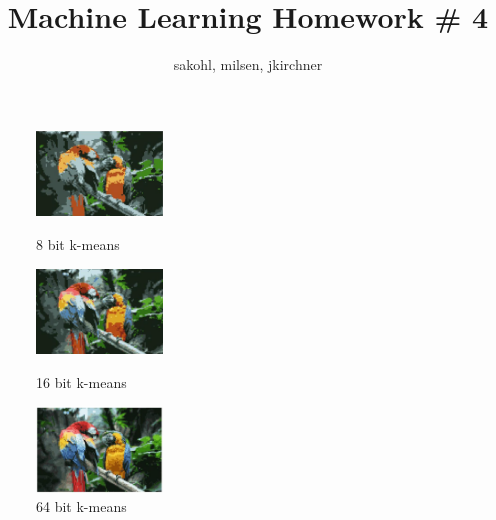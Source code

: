 \documentclass[a4paper]{article}
\title{Machine Learning Homework \# 4}
\author{sakohl, milsen, jkirchner}
\begin{document}
\maketitle



\begin{figure}
\centering
\includegraphics[width=0.3\textwidth]{8bitkmeans.jpg}
\caption{\label{fig:8bit}8 bit k-means}

\includegraphics[width=0.3\textwidth]{16bitkmeans.jpg}
\caption{\label{fig:16bit}16 bit k-means}

\includegraphics[width=0.3\textwidth]{64bitkmeans.jpg}
\caption{\label{fig:64bit}64 bit k-means}
\end{figure}
\end{document}
